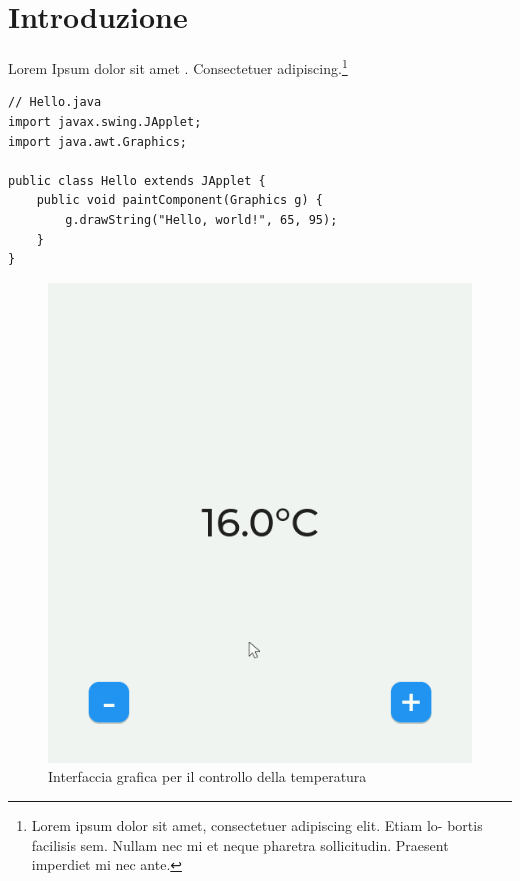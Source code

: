 \chapter{Introduzione}
Lorem Ipsum \cite{defusco}
 dolor sit amet \cite{Axa}.
Consectetuer adipiscing.\footnote{Lorem ipsum dolor sit amet, consectetuer adipiscing elit. Etiam lo-
bortis facilisis sem. Nullam nec mi et neque pharetra sollicitudin. Praesent
imperdiet mi nec ante. }

\begin{verbatim}
// Hello.java
import javax.swing.JApplet;
import java.awt.Graphics;

public class Hello extends JApplet {
    public void paintComponent(Graphics g) {
        g.drawString("Hello, world!", 65, 95);
    }    
}
\end{verbatim}

\Blindtext

\begin{figure}
    \centering
    \includegraphics[width=15cm]{Immagini/lvgl-gui.png}  
    \caption{Interfaccia grafica per il controllo della temperatura}
\end{figure}
